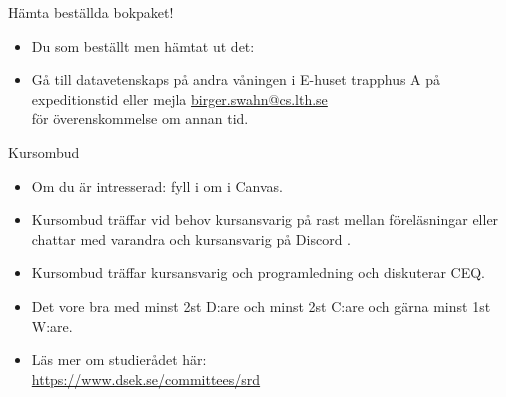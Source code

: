 
\ifkompendium\else
\begin{SlideExtra}{Hämta beställda bokpaket!}
  \begin{itemize}
    \item Du som beställt  men  hämtat ut det: \\
    \item[] Gå till datavetenskaps  på andra våningen i E-huset trapphus A på expeditionstid eller mejla \url{birger.swahn@cs.lth.se} \\ för överenskommelse om annan tid. 
  \end{itemize}
\end{SlideExtra}


  
\begin{SlideExtra}{Kursombud}
\begin{itemize}
\item Om du är intresserad: fyll i  om  i Canvas.
\item Kursombud träffar vid behov kursansvarig på rast mellan föreläsningar eller chattar med varandra och kursansvarig på Discord .
\item Kursombud träffar kursansvarig och programledning  och diskuterar  CEQ.
\item Det vore bra med minst 2st D:are och minst 2st C:are och gärna minst 1st W:are.
\item Läs mer om studierådet här:\\{\SlideFontSmall\url{https://www.dsek.se/committees/srd}}
\end{itemize}
\end{SlideExtra}
\fi
